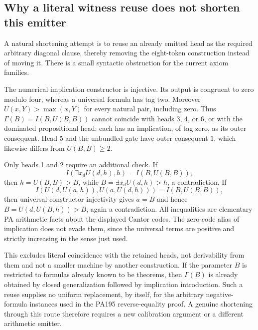 \subsection{Why a literal witness reuse does not shorten this emitter}
A natural shortening attempt is to reuse an already emitted head as the
required arbitrary diagonal clause, thereby removing the eight-token
construction instead of moving it.  There is a small syntactic obstruction
for the current axiom families.

The numerical implication constructor is injective.  Its output is
congruent to zero modulo four, whereas a universal formula has tag two.
Moreover $U(x,Y)>\max(x,Y)$ for every natural pair, including zero.
Thus $\Gamma(B)=I(B,U(B,B))$ cannot coincide with heads 3, 4, or 6, or
with the dominated propositional head: each has an implication, of tag zero,
as its outer consequent.  Head 5 and the unbundled gate have outer consequent
$1$, which likewise differs from $U(B,B)\ge2$.

Only heads 1 and 2 require an additional check.  If
\[
 I(\exists x_d U(d,h),h)=I(B,U(B,B)),
\]
then $h=U(B,B)>B$, while
$B=\exists x_d U(d,h)>h$, a contradiction.  If
\[
 I(U(d,U(a,h)),U(a,U(d,h)))=I(B,U(B,B)),
\]
then universal-constructor injectivity gives $a=B$ and hence
$B=U(d,U(B,h))>B$, again a contradiction.  All inequalities are elementary
PA arithmetic facts about the displayed Cantor codes.  The zero-code alias
of implication does not evade them, since the universal terms are positive
and strictly increasing in the sense just used.

This excludes literal coincidence with the retained heads, not derivability
from them and not a smaller machine by another construction.  If the
parameter $B$ is restricted to formulas already known to be theorems, then
$\Gamma(B)$ is already obtained by closed generalization followed by
implication introduction.  Such a reuse supplies no uniform replacement,
by itself, for the arbitrary negative-formula instances used in the PA195
reverse-equality proof.  A genuine shortening through this route therefore
requires a new calibration argument or a different arithmetic emitter.
